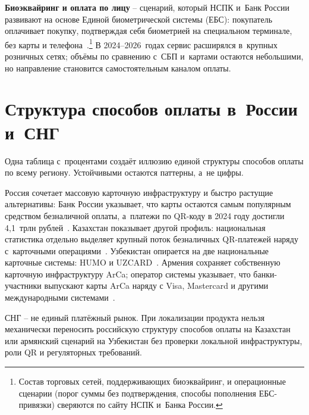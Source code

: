\textbf{Биоэквайринг и оплата по лицу} -- сценарий, который
НСПК и~Банк России развивают на основе Единой биометрической
системы (ЕБС): покупатель оплачивает покупку, подтверждая
себя биометрией на специальном терминале, без карты и
телефона~\cite{nspk-biopay-overview,ebs-overview}.\footnote{Состав
торговых сетей, поддерживающих биоэквайринг, и операционные
сценарии (порог суммы без подтверждения, способы пополнения
ЕБС-привязки) сверяются по сайту НСПК и~Банка России.}
В 2024--2026~годах сервис расширялся в~крупных розничных
сетях; объёмы по сравнению с~СБП и~картами остаются
небольшими, но направление становится самостоятельным каналом
оплаты.


\section{Структура способов оплаты в~России и~СНГ}\label{sec:alt-mix}

Одна таблица с~процентами создаёт иллюзию единой структуры способов
оплаты по всему региону. Устойчивыми остаются паттерны, а~не цифры.

Россия сочетает массовую карточную инфраструктуру и быстро растущие
альтернативы: Банк России указывает, что карты остаются самым
популярным средством безналичной оплаты, а~платежи по QR-коду
в 2024 году достигли 4{,}1~трлн рублей~\cite{cbr-results-2024-payments}. Казахстан показывает другой
профиль: национальная статистика отдельно выделяет крупный поток
безналичных QR-платежей наряду с~карточными операциями~\cite{nbk-payment-cards-2025jan}. Узбекистан опирается на две
национальные карточные системы: HUMO и UZCARD~\cite{humo-faq,uzcard-about}. Армения сохраняет
собственную карточную инфраструктуру ArCa; оператор
системы указывает, что банки-участники выпускают карты ArCa
наряду с Visa, Mastercard и другими международными
системами~\cite{arca-about}.

СНГ -- не единый платёжный рынок. При локализации продукта нельзя
механически переносить российскую структуру способов оплаты на
Казахстан или армянский сценарий на Узбекистан без проверки локальной
инфраструктуры, роли QR и регуляторных требований.

